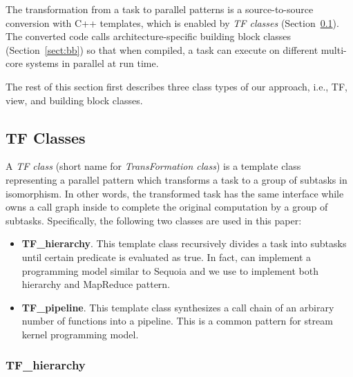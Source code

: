 The transformation from a task to parallel patterns is a
source-to-source conversion with C++ templates, which is enabled by \emph{TF
classes} (Section~\ref{sect:tf}).  The converted code calls
architecture-specific building block classes (Section~\ref{sect:bb}) so that
when compiled, a task can execute on
different multi-core systems in parallel at run time. 

The rest of this section first describes three class types of our approach, i.e.,
TF, view, and building block classes. 

\subsection{TF Classes}
\label{sect:tf}

A \textit{TF class} (short name for \textit{TransFormation class}) is a template
class representing a parallel pattern which transforms a task to a group of
subtasks in isomorphism. In other words, the transformed task has the same interface
while owns a call graph inside to complete the original computation by a
group of subtasks. Specifically, the following two classes are used in this paper: 

\begin{itemize} 
\item \textbf{TF\_hierarchy}. This template class recursively divides a task into subtasks
until certain predicate is evaluated as true. %
In fact,  can implement a programming model similar to Sequoia and
we use  to implement both hierarchy and MapReduce pattern.

\item \textbf{TF\_pipeline}. This template class synthesizes a call chain of an
arbirary number of functions into a pipeline. This is a common pattern for
stream kernel programming model.
\end{itemize} 

\subsubsection{TF\_hierarchy}

